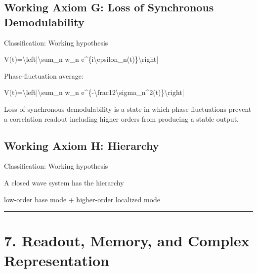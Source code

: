 \documentclass[
  a4paper,
]{article}
\newenvironment{Shaded}{}{}
\newcommand{\NormalTok}[1]{#1}
\begin{document}
\subsection{Working Axiom G: Loss of Synchronous
Demodulability}\label{working-axiom-g-loss-of-synchronous-demodulability}

Classification: Working hypothesis

\begin{Shaded}
\begin{Highlighting}[]
\NormalTok{V(t)=\textbackslash{}left|\textbackslash{}sum\_n w\_n e\^{}\{i\textbackslash{}epsilon\_n(t)\}\textbackslash{}right|}
\end{Highlighting}
\end{Shaded}

Phase-fluctuation average:

\begin{Shaded}
\begin{Highlighting}[]
\NormalTok{V(t)=\textbackslash{}left|\textbackslash{}sum\_n w\_n e\^{}\{{-}\textbackslash{}frac12\textbackslash{}sigma\_n\^{}2(t)\}\textbackslash{}right|}
\end{Highlighting}
\end{Shaded}

Loss of synchronous demodulability is a state in which phase
fluctuations prevent a correlation readout including higher orders from
producing a stable output.

\subsection{Working Axiom H: Hierarchy}\label{working-axiom-h-hierarchy}

Classification: Working hypothesis

A closed wave system has the hierarchy

\begin{Shaded}
\begin{Highlighting}[]
\NormalTok{low{-}order base mode}
\NormalTok{+ higher{-}order localized mode}
\end{Highlighting}
\end{Shaded}

\begin{center}\rule{0.5\linewidth}{0.5pt}\end{center}

\section{7. Readout, Memory, and Complex
Representation}\label{readout-memory-and-complex-representation}
\end{document}
